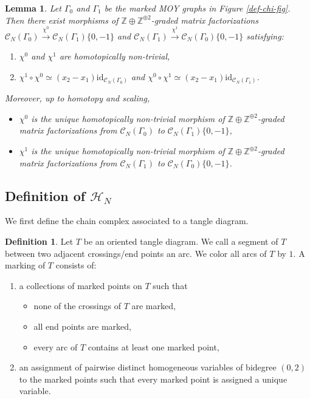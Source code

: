 \documentclass{amsart}
\theoremstyle{plain}
\newtheorem{lemma}[theorem]{Lemma}
\theoremstyle{definition}
\newtheorem{definition}[theorem]{Definition}
\theoremstyle{remark}
\numberwithin{equation}{section}
\begin{document}
\begin{lemma}\cite[Lemma 3.15]{Wu-triple-trans}\label{lemma-def-chi}
Let $\Gamma_0$ and $\Gamma_1$ be the marked MOY graphs in Figure \ref{def-chi-fig}. Then there exist morphisms of ${\mathbb{Z}} \oplus {\mathbb{Z}}^{\oplus 2}$-graded matrix factorizations ${\mathcal{C}}_N(\Gamma_0) \xrightarrow{\chi^0} {\mathcal{C}}_N(\Gamma_1)\{0,-1\}$ and ${\mathcal{C}}_N(\Gamma_1) \xrightarrow{\chi^1} {\mathcal{C}}_N(\Gamma_0)\{0,-1\}$ satisfying:
\begin{enumerate}
  \item $\chi^0$ and $\chi^1$ are homotopically non-trivial,
	\item $\chi^1 \circ \chi^0 \simeq (x_2-x_1){\mathrm{id}}_{{\mathcal{C}}_N(\Gamma_0)}$ and $\chi^0 \circ \chi^1 \simeq (x_2-x_1){\mathrm{id}}_{{\mathcal{C}}_N(\Gamma_1)}$.
\end{enumerate}
Moreover, up to homotopy and scaling, 
\begin{itemize}
	\item $\chi^0$ is the unique homotopically non-trivial morphism of ${\mathbb{Z}} \oplus {\mathbb{Z}}^{\oplus 2}$-graded matrix factorizations from ${\mathcal{C}}_N(\Gamma_0)$ to ${\mathcal{C}}_N(\Gamma_1)\{0,-1\}$,
	\item $\chi^1$ is the unique homotopically non-trivial morphism of ${\mathbb{Z}} \oplus {\mathbb{Z}}^{\oplus 2}$-graded matrix factorizations from ${\mathcal{C}}_N(\Gamma_1)$ to ${\mathcal{C}}_N(\Gamma_0)\{0,-1\}$.
\end{itemize}
\end{lemma}

\subsection{Definition of ${\mathcal{H}}_N$} We first define the chain complex associated to a tangle diagram.

\begin{definition}\label{def-marking-tangle}
Let $T$ be an oriented tangle diagram. We call a segment of $T$ between two adjacent crossings/end points an arc. We color all arcs of $T$ by $1$. A marking of $T$ consists of:
\begin{enumerate}
	\item a collections of marked points on $T$ such that
	      \begin{itemize}
	            \item none of the crossings of $T$ are marked, 
	            \item all end points are marked,
	            \item every arc of $T$ contains at least one marked point,
        \end{itemize}
	\item an assignment of pairwise distinct homogeneous variables of bidegree $(0,2)$ to the marked points such that every marked point is assigned a unique variable.
\end{enumerate} 
\end{definition}
\end{document}
